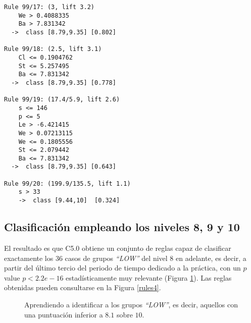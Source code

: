 \begin{tcolorbox}[title=Reglas de clasificación para identificar intervalos de notas.]
\begin{multicols}{3}
\begin{verbatim}
Rule 99/17: (3, lift 3.2)
	We > 0.4088335
	Ba > 7.831342
  ->  class [8.79,9.35] [0.802]

Rule 99/18: (2.5, lift 3.1)
	Cl <= 0.1904762
	St <= 5.257495
	Ba <= 7.831342
  ->  class [8.79,9.35] [0.778]

Rule 99/19: (17.4/5.9, lift 2.6)
	s <= 146
	p <= 5
	Le > -6.421415
	We > 0.07213115
	We <= 0.1805556
	St <= 2.079442
	Ba <= 7.831342
  ->  class [8.79,9.35] [0.643]

Rule 99/20: (199.9/135.5, lift 1.1)
	s > 33
	->  class [9.44,10]  [0.324]
    \end{verbatim}
  \end{multicols}
\label{rules7}
\end{tcolorbox}

\subsection{Clasificación empleando los niveles 8, 9 y 10}

El resultado es que C5.0 obtiene un conjunto de reglas capaz de clasificar exactamente los $36$ casos de grupos \emph{``LOW''} del nivel $8$ en adelante, es decir, a partir del último tercio del periodo de tiempo dedicado a la práctica, con un $p$ value $p < 2.2e-16$ estadísticamente muy relevante (Figura \ref{fig:cm4}). Las reglas obtenidas pueden consultarse en la Figura \ref{rules4}.

\begin{figure}[H]
\centering
{}
\caption{Aprendiendo a identificar a los grupos \emph{``LOW''}, es decir, aquellos con una puntuación inferior a $8.1$ sobre $10$.}
\label{fig:cm4}
\end{figure}


